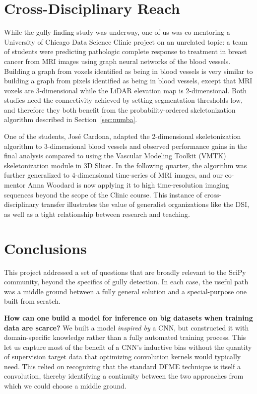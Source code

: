 \section{Cross-Disciplinary Reach}

While the gully-finding study was underway, one of us was co-mentoring a University of Chicago Data Science Clinic project on an unrelated topic: a team of students were predicting pathologic complete response to treatment in breast cancer from MRI images using graph neural networks of the blood vessels. Building a graph from voxels identified as being in blood vessels is very similar to building a graph from pixels identified as being in blood vessels, except that MRI voxels are 3-dimensional while the LiDAR elevation map is 2-dimensional. Both studies need the connectivity achieved by setting segmentation thresholds low, and therefore they both benefit from the probability-ordered skeletonization algorithm described in Section~\ref{sec:numba}.

One of the students, Jos\'e Cardona, adapted the 2-dimensional skeletonization algorithm to 3-dimensional blood vessels and observed performance gains in the final analysis compared to using the Vascular Modeling Toolkit (VMTK) skeletonization module in 3D Slicer. In the following quarter, the algorithm was further generalized to 4-dimensional time-series of MRI images, and our co-mentor Anna Woodard is now applying it to high time-resolution imaging sequences beyond the scope of the Clinic course. This instance of cross-disciplinary transfer illustrates the value of generalist organizations like the DSI, as well as a tight relationship between research and teaching.

\section{Conclusions}

This project addressed a set of questions that are broadly relevant to the SciPy community, beyond the specifics of gully detection. In each case, the useful path was a middle ground between a fully general solution and a special-purpose one built from scratch.

\textbf{How can one build a model for inference on big datasets when training data are scarce?} We built a model \textit{inspired by} a CNN, but constructed it with domain-specific knowledge rather than a fully automated training process. This let us capture most of the benefit of a CNN's inductive bias without the quantity of supervision target data that optimizing convolution kernels would typically need. This relied on recognizing that the standard DFME technique is itself a convolution, thereby identifying a continuity between the two approaches from which we could choose a middle ground.

